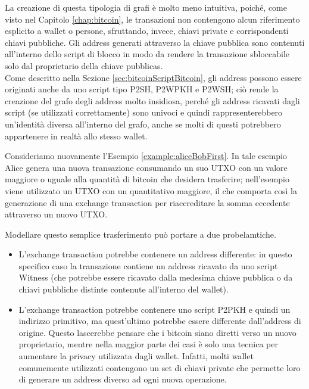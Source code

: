 La creazione di questa tipologia di grafi è molto meno intuitiva, poiché, come visto nel Capitolo \ref{chap:bitcoin}, le transazioni non contengono alcun riferimento esplicito a wallet o persone, sfruttando, invece, chiavi private e corrispondenti chiavi pubbliche. Gli address generati attraverso la chiave pubblica sono contenuti all’interno dello script di blocco in modo da rendere la transazione sbloccabile solo dal proprietario della chiave pubblicas. \\
Come descritto nella Sezione \ref{sec:bitcoinScriptBitcoin}, gli address possono essere originati anche da uno script tipo P2SH, P2WPKH e P2WSH; ciò rende la creazione del grafo degli address molto insidiosa, perché gli address ricavati dagli script (se utilizzati correttamente) sono univoci e quindi rappresenterebbero un’identità diversa all’interno del grafo, anche se molti di questi potrebbero appartenere in realtà allo stesso wallet.

\begin{example}
Consideriamo nuovamente l’Esempio \ref{example:aliceBobFirst}. In tale esempio  Alice genera una nuova transazione consumando un suo UTXO con un valore maggiore o uguale alla quantità  di bitcoin che desidera trasferire; nell'esempio viene utilizzato un UTXO con un quantitativo maggiore, il che comporta così la generazione di una exchange transaction per riaccreditare la somma eccedente attraverso un nuovo UTXO.

Modellare questo semplice trasferimento può portare a due probelamtiche.

\begin{itemize}
  \item L’exchange transaction potrebbe contenere un address differente: in questo specifico caso la transazione contiene un address ricavato da uno script Witness (che potrebbe essere ricavato dalla medesima chiave pubblica o da chiavi pubbliche distinte contenute all’interno del wallet).

  \item L'exchange transaction potrebbe contenere uno script P2PKH e quindi un indirizzo primitivo, ma quest’ultimo potrebbe essere differente dall’address di origine. Questo lascerebbe pensare che i bitcoin  siano diretti verso un nuovo proprietario, mentre nella maggior parte dei casi è solo una tecnica per aumentare la privacy utilizzata dagli wallet.
Infatti, molti  wallet comunemente utilizzati contengono un set di chiavi private che permette loro di generare un address diverso ad ogni nuova operazione.
\end{itemize}

\end{example}

